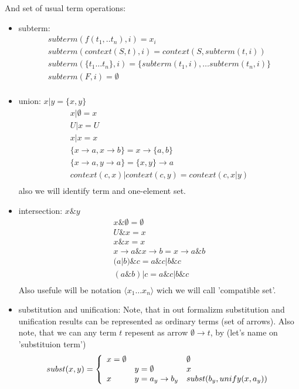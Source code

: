 \documentclass[12pt]{article}
\begin{document}
 And set of usual term operations:
 \begin{itemize}
   \item subterm:  
        $$ \left.\begin{array}{l}
           subterm(f(t_1,..t_n),i)=x_i  \\
           subterm(context(S,t),i)=context(S,subterm(t,i)) \\
           subterm(\{t_1 \dots t_n \},i)=\{subterm(t_1,i), \dots subterm(t_n,i)\}  \\
           subterm(F,i)=\emptyset \\
           \end{array}\right.
        $$
   \item union: $ x | y = \{ x, y \}$
        $$ \left.\begin{array}{l}
             x | \emptyset = x  \\
             U | x = U \\
             {x | x } = x \\
	     \{ x \to a, x \to b \} = x \to \{a,b\} \\
             \{ x \to a, y \to a \} = \{ x, y\} \to a \\
             context(c,x) | context(c,y) = context(c, x|y) \\
           \end{array}\right.
        $$
       also we will identify term and one-element set.

   \item intersection: $ x \& y $
        $$ \left.\begin{array}{l}
             x \& \emptyset = \emptyset  \\
             U \& x = x \\
             {x \& x } = x \\
             x \to a \& x \to b  = x \to a \& b \\
             (a | b ) \& c = a\& c | b\&c \\
             (a \& b ) | c = a\& c | b\&c \\
           \end{array}\right.
        $$
         Also usefule will be notation $\langle x_1 \dots x_n \rangle$ wich we will call 'compatible set'.

         
   \item substitution and unification:  
        Note, that in out formalizm substitution and unification results can be represented as ordinary terms
        (set of arrows). Also note, that we can any term $t$ repesent as arrow $\emptyset \to t$, by
        (let's name on 'substituion term')
        $$ subst(x,y) = 
           \left\{\begin{array}{l l l }
             x=\emptyset &             & \emptyset \\
                         & y=\emptyset & x \\
             x           & y=a_{y} \to b_{y} & subst(b_{y},unify(x,a_{y})) \\
           \end{array}\right.
        $$


\end{itemize}
\end{document}
